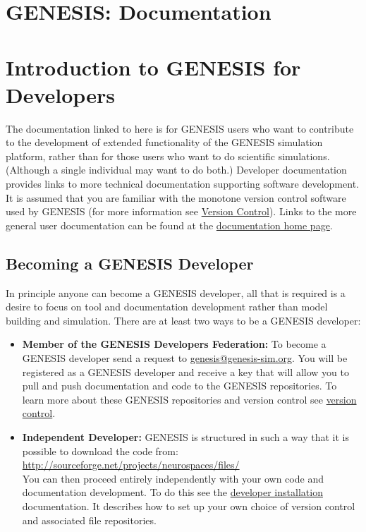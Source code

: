 \documentclass[12pt]{article}
\begin{document}
\section*{GENESIS: Documentation}

\section*{Introduction to GENESIS for Developers}

The documentation linked to here is for GENESIS users who want to contribute to the development of extended functionality of the GENESIS simulation platform, rather than for those users who want to do scientific simulations. (Although a single individual may want to do both.) Developer documentation provides links to more technical documentation supporting software development. It is assumed that you are familiar with the monotone version control software used by GENESIS (for more information see \href{../version-control/version-control.tex}{Version Control}). Links to the more general user documentation can be found at the \href{../documentation-homepage/documentation-homepage.tex}{documentation home page}. 

\subsection*{Becoming a GENESIS Developer}

In principle anyone can become a GENESIS developer, all that is required is a desire to focus on tool and documentation development rather than model building and simulation. There are at least two ways to be a GENESIS  developer:

\begin{itemize}
	\item {\bf Member of the GENESIS Developers Federation:} To become a GENESIS developer send a request to 
	\href{mailto:genesis@genesis-sim.org}{genesis@genesis-sim.org}. You will be registered as a GENESIS developer 
	and receive a key that will allow you to pull and push documentation and code to the GENESIS repositories. To learn more 
	about these GENESIS repositories and version control see \href{../version-control/version-control.tex}{version control}.
	
	\item {\bf Independent Developer:} GENESIS is structured in such a way that it is possible to download the code from:\\
	\href{http://sourceforge.net/projects/neurospaces/files/}{http://sourceforge.net/projects/neurospaces/files/}\\
	You can then proceed entirely independently with your own code and documentation development. To do this see the 
	\href{../installation-developer/installation-developer.tex}{developer installation} documentation. It describes how to set up your own 
	choice of version control and associated file repositories.

\end{itemize}
\end{document}
